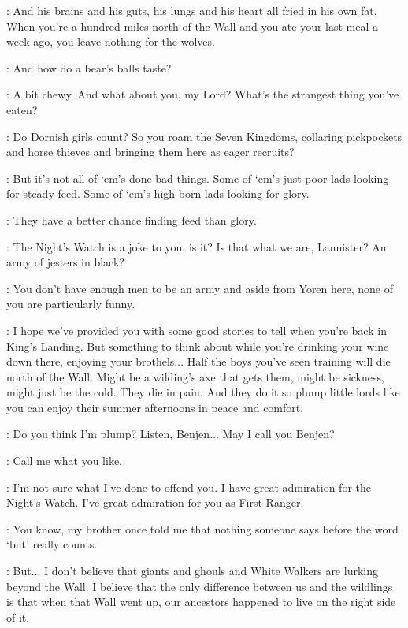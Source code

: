 \YOREN: And his brains and his guts, his lungs and his heart all fried in his own fat. When you're a hundred miles north of the Wall and you ate your last meal a week ago, you leave nothing for the wolves. 

\TYRION: And how do a bear's balls taste? 

\YOREN: A bit chewy. And what about you, my Lord? What's the strangest thing you've eaten? 

\TYRION: Do Dornish girls count? So you roam the Seven Kingdoms, collaring pickpockets and horse thieves and bringing them here as eager recruits? 

\YOREN: But it's not all of `em's done bad things. Some of `em's just poor lads looking for steady feed. Some of `em's high-born lads looking for glory. 

\TYRION: They have a better chance finding feed than glory. 


\BENJEN: The Night's Watch is a joke to you, is it? Is that what we are, Lannister? An army of jesters in black? 

\TYRION: You don't have enough men to be an army and aside from Yoren here, none of you are particularly funny. 

\BENJEN: I hope we've provided you with some good stories to tell when you're back in King's Landing. But something to think about while you're drinking your wine down there, enjoying your brothels$\ldots$ Half the boys you've seen training will die north of the Wall. Might be a wilding's axe that gets them, might be sickness, might just be the cold. They die in pain. And they do it so plump little lords like you can enjoy their summer afternoons in peace and comfort. 

\TYRION:  Do you think I'm plump? Listen, Benjen$\ldots$ May I call you Benjen? 

\BENJEN: Call me what you like. 

\TYRION: I'm not sure what I've done to offend you. I have great admiration for the Night's Watch. I've great admiration for you as First Ranger. 

\BENJEN: You know, my brother once told me that nothing someone says before the word `but' really counts. 

\TYRION: But$\ldots$ I don't believe that giants and ghouls and White Walkers are lurking beyond the Wall. I believe that the only difference between us and the wildlings is that when that Wall went up, our ancestors happened to live on the right side of it. 

